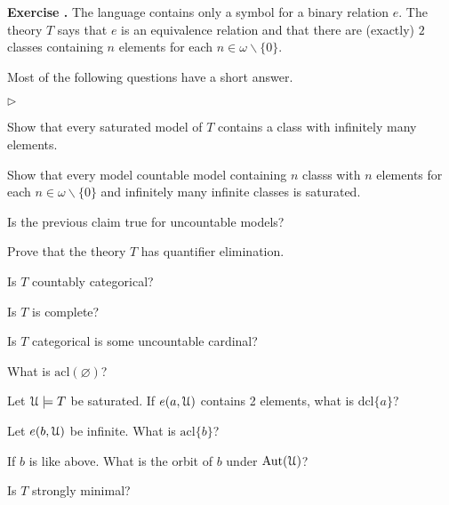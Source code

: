 \documentclass[10pt]{article}
\def\U{\EuScript U}
\def\sm{\smallsetminus}
\def\Aut{\textrm{Aut}}
\def\acl{\textrm{acl}}
\def\dcl{\textrm{dcl}}
\newcommand{\labella}[1]{{\sf\footnotesize #1}\hfill}
\renewenvironment{itemize}
  {\begin{list}{$\triangleright$}{%
   \setlength{\parskip}{0mm}
   \setlength{\topsep}{0mm}
   \setlength{\rightmargin}{0mm}
   \setlength{\listparindent}{0mm}
   \setlength{\itemindent}{0mm}
   \setlength{\labelwidth}{3ex}
   \setlength{\itemsep}{0mm}
   \setlength{\parsep}{0mm}
   \setlength{\partopsep}{0mm}
   \setlength{\labelsep}{1ex}
   \setlength{\leftmargin}{\labelwidth+\labelsep}
   \let\makelabel\labella}}{%
   \end{list}}
\newcounter{ex}
\newenvironment{exercise}{\bigskip\addtocounter{ex}{1}\textbf{Exercise \theex.\quad}}{}
\begin{document}
\begin{exercise}
The language contains only a symbol for a binary relation $e$. The theory $T$ says that $e$ is an equivalence relation and that there are (exactly) $2$ classes containing $n$ elements for each $n\in\omega\sm\{0\}$. 

Most of the following questions have a short answer.

\medskip
\begin{itemize}
\item[1.] Show that every saturated model of $T$ contains a class with infinitely many elements.
\item[2.] Show that every model countable model containing $n$ classs with $n$ elements for each $n\in\omega\sm\{0\}$ and infinitely many infinite classes is saturated.
\item[3.] Is the previous claim true for uncountable models?
\item[4.] Prove that the theory $T$ has quantifier elimination.  
\item[5.]  Is $T$ countably categorical? 
\item[6.] Is $T$ is complete?
\item[7.] Is $T$ categorical is some uncountable cardinal?
\item[8.] What is $\acl(\varnothing)$?
\item[9.] Let $\U\models T$ be saturated. If $e(a,\U)$ contains 2 elements, what is $\dcl\{a\}$?
\item[10.] Let $e(b,\U)$ be infinite. What is $\acl\{b\}$?
\item[11.] If $b$ is like above. What is the orbit of $b$ under $\Aut(\U)$?
\item[12.] Is $T$ strongly minimal?
\end{itemize}
\end{exercise}
\end{document}
